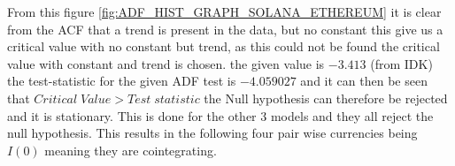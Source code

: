 \noindent From this figure \ref{fig:ADF_HIST_GRAPH_SOLANA_ETHEREUM} it is clear from the ACF that a trend is present in the data, but no constant this give us a critical value with no constant but trend, as this could not be found the critical value with constant and trend is chosen. the given value is $-3.413$ (from IDK) the test-statistic for the given ADF test is $-4.059027$ and it can then be seen that $Critical\; Value>Test\;statistic$ the Null hypothesis can therefore be rejected and it is stationary. This is done for the other 3 models and they all reject the null hypothesis. This results in the following four pair wise currencies being $I(0)$ meaning they are cointegrating. 













